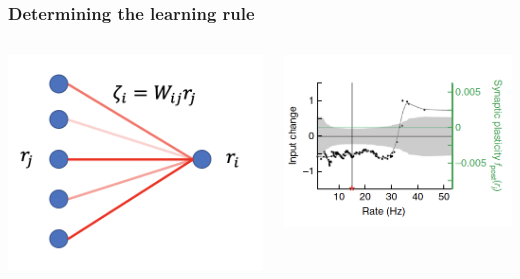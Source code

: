 \documentclass{beamer}
\begin{document}
\begin{frame}[plain]
\frametitle{Determining the learning rule}


\begin{columns}[T]
\begin{column}{.3\textwidth}
\begin{center}
\includegraphics[scale=0.5]{net}
\end{center}
\end{column}

\begin{column}{.7\textwidth}
\begin{center}
\includegraphics[scale=0.65]{learning-rules-g}
\end{center}
\end{column}


\end{columns}
\end{frame}
\end{document}

